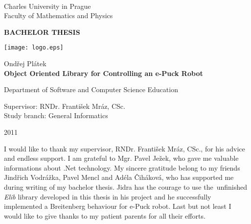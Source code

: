 \begin{titlepage}
\begin{center}
\ \\

\vspace{15mm}

\large
Charles University in Prague\\
Faculty of Mathematics and Physics\\

\vspace{5mm}

{\Large\bf BACHELOR THESIS}

\vspace{10mm}

\texttt{[image: logo.eps]} %

\vspace{15mm}
{\Large Ondřej Plátek}\\ 

\vspace{5mm}
{\Large\bf Object Oriented Library for Controlling an e-Puck Robot}

\vspace{20mm}
\large
\noindent
Department of Software and Computer Science Education

\noindent
 Supervisor: RNDr. František Mráz, CSc.\\
 Study branch: General Informatics\\
\end{center}
\vspace{20mm}
\begin{center}
2011
\end{center}

\end{titlepage} %

\normalsize %
\vspace{10mm} 

\noindent I would like to thank my supervisor, RNDr. František Mráz, CSc., for his
advice and endless support. I am grateful to Mgr. Pavel Ježek, who gave me 
valuable informations about .Net technology. 
My sincere gratitude belong to my friends Jindřich Vodrážka, Pavel Mencl and Adéla Čiháková,
who has supported me during writing of my bachelor thesis.
Jidra has the courage to use the~unfinished {\it Elib} library developed in this thesis in his project and
he successfully implemented a Breitenberg behaviour for e-Puck robot.
Last but not least I would like to give thanks to my patient parents for all their efforts.


